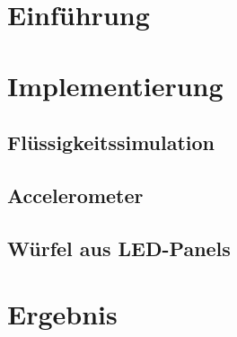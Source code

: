 \documentclass[12pt, a4paper]{book}
\begin{document}
\pagestyle{fancy}






\clearpage
\chapter{Einführung}
\label{chap:einfuehrung}


\chapter{Implementierung}
\label{chap:implementierung}

\clearpage
\section{Flüssigkeitssimulation}
\label{chap:impl:sph}

\clearpage
\section{Accelerometer}
\label{chap:impl:accel}

\clearpage
\section{Würfel aus LED-Panels}
\label{chap:impl:ledcube}

\clearpage

\chapter{Ergebnis}


\clearpage




\clearpage\newpage
{}

\end{document}
